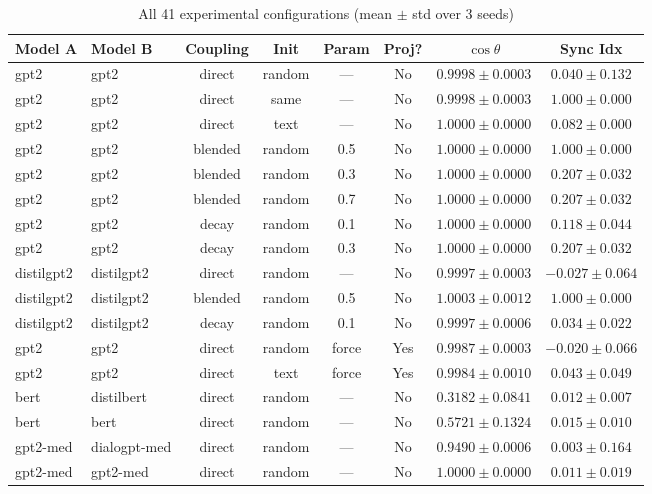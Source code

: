 \documentclass[10pt]{article} %
\theoremstyle{plain}
\theoremstyle{definition}
\theoremstyle{remark}
\begin{document}
\begin{table}[H]
\centering
\caption{All 41 experimental configurations (mean $\pm$ std over 3 seeds)}
\label{tab:complete}
\scriptsize
\begin{tabular}{llcccccc}
\toprule
\textbf{Model A} & \textbf{Model B} & \textbf{Coupling} & \textbf{Init} & \textbf{Param} & \textbf{Proj?} & \textbf{$\cos \theta$} & \textbf{Sync Idx} \\
\midrule
gpt2 & gpt2 & direct & random & --- & No & $0.9998 \pm 0.0003$ & $0.040 \pm 0.132$ \\
gpt2 & gpt2 & direct & same & --- & No & $0.9998 \pm 0.0003$ & $1.000 \pm 0.000$ \\
gpt2 & gpt2 & direct & text & --- & No & $1.0000 \pm 0.0000$ & $0.082 \pm 0.000$ \\
gpt2 & gpt2 & blended & random & 0.5 & No & $1.0000 \pm 0.0000$ & $1.000 \pm 0.000$ \\
gpt2 & gpt2 & blended & random & 0.3 & No & $1.0000 \pm 0.0000$ & $0.207 \pm 0.032$ \\
gpt2 & gpt2 & blended & random & 0.7 & No & $1.0000 \pm 0.0000$ & $0.207 \pm 0.032$ \\
gpt2 & gpt2 & decay & random & 0.1 & No & $1.0000 \pm 0.0000$ & $0.118 \pm 0.044$ \\
gpt2 & gpt2 & decay & random & 0.3 & No & $1.0000 \pm 0.0000$ & $0.207 \pm 0.032$ \\
\midrule
distilgpt2 & distilgpt2 & direct & random & --- & No & $0.9997 \pm 0.0003$ & $-0.027 \pm 0.064$ \\
distilgpt2 & distilgpt2 & blended & random & 0.5 & No & $1.0003 \pm 0.0012$ & $1.000 \pm 0.000$ \\
distilgpt2 & distilgpt2 & decay & random & 0.1 & No & $0.9997 \pm 0.0006$ & $0.034 \pm 0.022$ \\
\midrule
gpt2 & gpt2 & direct & random & force & Yes & $0.9987 \pm 0.0003$ & $-0.020 \pm 0.066$ \\
gpt2 & gpt2 & direct & text & force & Yes & $0.9984 \pm 0.0010$ & $0.043 \pm 0.049$ \\
\midrule
bert & distilbert & direct & random & --- & No & $0.3182 \pm 0.0841$ & $0.012 \pm 0.007$ \\
bert & bert & direct & random & --- & No & $0.5721 \pm 0.1324$ & $0.015 \pm 0.010$ \\
\midrule
gpt2-med & dialogpt-med & direct & random & --- & No & $0.9490 \pm 0.0006$ & $0.003 \pm 0.164$ \\
gpt2-med & gpt2-med & direct & random & --- & No & $1.0000 \pm 0.0000$ & $0.011 \pm 0.019$ \\

\end{tabular}
\end{table}
\end{document}
